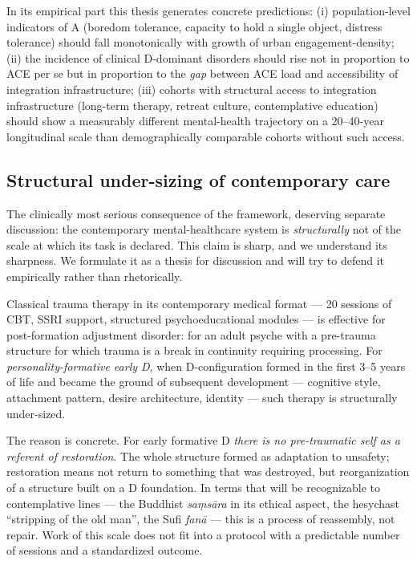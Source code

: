 In its empirical part this thesis generates concrete predictions: (i) population-level indicators of A (boredom tolerance, capacity to hold a single object, distress tolerance) should fall monotonically with growth of urban engagement-density; (ii) the incidence of clinical D-dominant disorders should rise not in proportion to ACE per se but in proportion to the \emph{gap} between ACE load and accessibility of integration infrastructure; (iii) cohorts with structural access to integration infrastructure (long-term therapy, retreat culture, contemplative education) should show a measurably different mental-health trajectory on a 20--40-year longitudinal scale than demographically comparable cohorts without such access.

\subsection{Structural under-sizing of contemporary care}
\label{subsec:undersizing}

The clinically most serious consequence of the \DEIC{} framework, deserving separate discussion: the contemporary mental-healthcare system is \emph{structurally} not of the scale at which its task is declared. This claim is sharp, and we understand its sharpness. We formulate it as a thesis for discussion and will try to defend it empirically rather than rhetorically.

Classical trauma therapy in its contemporary medical format --- 20 sessions of CBT, SSRI support, structured psychoeducational modules --- is effective for post-formation adjustment disorder: for an adult psyche with a pre-trauma structure for which trauma is a break in continuity requiring processing. For \emph{personality-formative early D}, when D-configuration formed in the first 3--5 years of life and became the ground of subsequent development --- cognitive style, attachment pattern, desire architecture, identity --- such therapy is structurally under-sized.

The reason is concrete. For early formative D \emph{there is no pre-traumatic self as a referent of restoration}. The whole structure formed as adaptation to unsafety; restoration means not return to something that was destroyed, but reorganization of a structure built on a D foundation. In terms that will be recognizable to contemplative lines --- the Buddhist \textit{saṃsāra} in its ethical aspect, the hesychast ``stripping of the old man'', the Sufi \textit{fanā} --- this is a process of reassembly, not repair. Work of this scale does not fit into a protocol with a predictable number of sessions and a standardized outcome.

